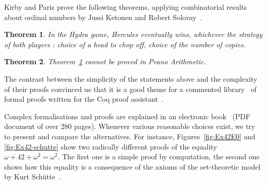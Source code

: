 \documentclass{easychair}
\newtheorem{theorem}{Theorem}
\newcommand{\coq}{Coq\xspace}
\begin{document}


Kirby and Paris prove the following theorems, applying
combinatorial results about ordinal numbers by Jussi Ketonen and Robert Solovay~\cite{KS81}.

\begin{theorem}
  In the Hydra game, Hercules eventually wins, whichever the strategy of both players :
  choice of a head to chop off, choice of the number of copies. 
 \label{kp:thm1}
\end{theorem}

\begin{theorem}
  Theorem~\ref{kp:thm1} cannot be proved in Peano Arithmetic. \label{kp:thm2}
\end{theorem}

The contrast between the simplicity of the statements above and the complexity of their proofs convinced us that it is a good theme for a commented library~\cite{HydraBattles} of formal proofs written for the \coq proof assistant~\cite{Coq}. 

Complex formalisations and proofs are explained in an
  electronic book~\cite{HydraBook} (PDF document of over 280 pages). Whenever various reasonable choices exist, we try to present and compare the alternatives.
  For instance, Figures~\ref{fig:Ex42E0} and \ref{fig:Ex42-schutte} show two radically different proofs of the equality
  $\omega+42+\omega^2=\omega^2$. The first one is a simple proof by computation, the second one shows how this equality
  is a consequence of the axioms of the set-theoretic model  by Kurt Schütte~\cite{schutte}. 
\end{document}
